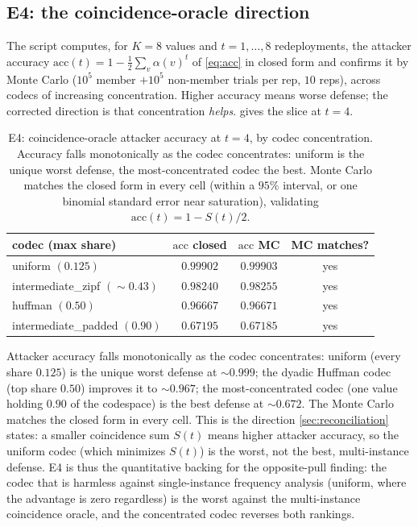 \documentclass[acmsmall,review]{acmart}
\newcommand{\al}{\alpha}                    %
\begin{document}
\subsection{E4: the coincidence-oracle direction}

The script computes, for $K = 8$ values and $t = 1, \dots, 8$ redeployments, the attacker
accuracy $\mathrm{acc}(t) = 1 - \tfrac12 \sum_v \al(v)^t$ of \eqref{eq:acc} in closed form
and confirms it by Monte Carlo ($10^5$ member $+ 10^5$ non-member trials per rep, $10$
reps), across codecs of increasing concentration. Higher accuracy means worse defense; the
corrected direction is that concentration \emph{helps}.  gives the slice at
$t = 4$.

\begin{table}[t]
  \centering
  \caption{E4: coincidence-oracle attacker accuracy at $t = 4$, by codec concentration.
  Accuracy falls monotonically as the codec concentrates: uniform is the unique worst
  defense, the most-concentrated codec the best. Monte Carlo matches the closed form in
  every cell (within a $95\%$ interval, or one binomial standard error near saturation),
  validating $\mathrm{acc}(t) = 1 - S(t)/2$.}
  \label{tab:e4}
  \begin{tabular}{lccc}
    \toprule
    codec (max share) & $\mathrm{acc}$ closed & $\mathrm{acc}$ MC & MC matches? \\
    \midrule
    uniform $(0.125)$              & $0.99902$ & $0.99903$ & yes \\
    intermediate\_zipf $(\sim 0.43)$ & $0.98240$ & $0.98255$ & yes \\
    huffman $(0.50)$              & $0.96667$ & $0.96671$ & yes \\
    intermediate\_padded $(0.90)$ & $0.67195$ & $0.67185$ & yes \\
    \bottomrule
  \end{tabular}
\end{table}

Attacker accuracy falls monotonically as the codec concentrates: uniform (every share
$0.125$) is the unique worst defense at $\sim 0.999$; the dyadic Huffman codec (top share
$0.50$) improves it to $\sim 0.967$; the most-concentrated codec (one value holding $0.90$
of the codespace) is the best defense at $\sim 0.672$. The Monte Carlo matches the closed
form in every cell. This is the direction \cref{sec:reconciliation} states: a smaller
coincidence sum $S(t)$ means higher attacker accuracy, so the uniform codec (which
minimizes $S(t)$) is the worst, not the best, multi-instance defense. E4 is thus the
quantitative backing for the opposite-pull finding: the codec that is harmless against
single-instance frequency analysis (uniform, where the advantage is zero regardless) is the
worst against the multi-instance coincidence oracle, and the concentrated codec reverses
both rankings.
\end{document}
